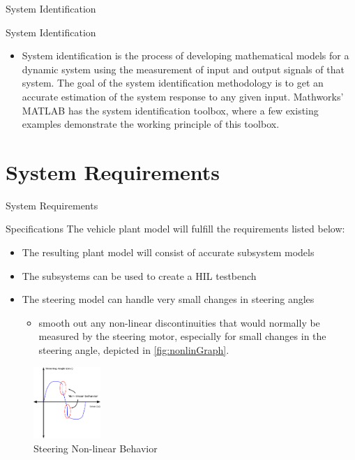 \documentclass{beamer}
\begin{document}
\begin{frame}{System Identification}
  \begin{block}{System Identification}
 \begin{itemize}
        \item System identification is the process of developing mathematical models for a dynamic system using the measurement of input and output signals of that system. The goal of the system identification methodology is to get an accurate estimation of the system response to any given input. Mathworks' MATLAB has the system identification toolbox, where a few existing examples demonstrate the working principle of this toolbox.
\end{itemize}
  \end{block}
\end{frame}



\section{System Requirements}

\begin{frame}{System Requirements}
  \begin{block}{Specifications}
    The vehicle plant model will fulfill the requirements listed below:
\begin{itemize}
    \item The resulting plant model will consist of accurate subsystem models
    \item The subsystems can be used to create a HIL testbench
    \item The steering model can handle very small changes in steering angles
    \begin{itemize}
    		\item smooth out any non-linear discontinuities that would normally be measured by the steering motor, especially for small changes in the steering angle, depicted in \autoref{fig:nonlinGraph}.
    \end{itemize}
\end{itemize}
\begin{figure}[h]
    \centering
    \captionsetup{justification=centering, margin=3cm}
    \includegraphics[width=1in]{figs/inkscape/nonlinearBehavior}
    \caption{Steering Non-linear Behavior}
    \label{fig:nonlinGraph}
\end{figure}
  \end{block}
\end{frame}
\end{document}

